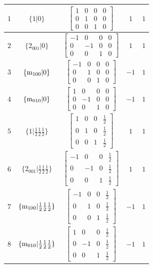 \documentclass[fleqn,8pt]{jsarticle}
\begin{document}
\begin{longtable}{ccccc}
$ 1 $ & $ \{1|0\} $ & $ \begin{bmatrix} 1 & 0 & 0 & 0 \\ 0 & 1 & 0 & 0 \\ 0 & 0 & 1 & 0 \end{bmatrix} $ & $ 1 $ & $ 1 $ \\ \hline
$ 2 $ & $ \{2{}_{001}|0\} $ & $ \begin{bmatrix} -1 & 0 & 0 & 0 \\ 0 & -1 & 0 & 0 \\ 0 & 0 & 1 & 0 \end{bmatrix} $ & $ 1 $ & $ 1 $ \\ \hline
$ 3 $ & $ \{{\rm m}_{100}|0\} $ & $ \begin{bmatrix} -1 & 0 & 0 & 0 \\ 0 & 1 & 0 & 0 \\ 0 & 0 & 1 & 0 \end{bmatrix} $ & $ -1 $ & $ 1 $ \\ \hline
$ 4 $ & $ \{{\rm m}_{010}|0\} $ & $ \begin{bmatrix} 1 & 0 & 0 & 0 \\ 0 & -1 & 0 & 0 \\ 0 & 0 & 1 & 0 \end{bmatrix} $ & $ -1 $ & $ 1 $ \\ \hline
$ 5 $ & $ \{1|\frac{1}{2} \frac{1}{2} \frac{1}{2}\} $ & $ \begin{bmatrix} 1 & 0 & 0 & \frac{1}{2} \\ 0 & 1 & 0 & \frac{1}{2} \\ 0 & 0 & 1 & \frac{1}{2} \end{bmatrix} $ & $ 1 $ & $ 1 $ \\ \hline
$ 6 $ & $ \{2{}_{001}|\frac{1}{2} \frac{1}{2} \frac{1}{2}\} $ & $ \begin{bmatrix} -1 & 0 & 0 & \frac{1}{2} \\ 0 & -1 & 0 & \frac{1}{2} \\ 0 & 0 & 1 & \frac{1}{2} \end{bmatrix} $ & $ 1 $ & $ 1 $ \\ \hline
$ 7 $ & $ \{{\rm m}_{100}|\frac{1}{2} \frac{1}{2} \frac{1}{2}\} $ & $ \begin{bmatrix} -1 & 0 & 0 & \frac{1}{2} \\ 0 & 1 & 0 & \frac{1}{2} \\ 0 & 0 & 1 & \frac{1}{2} \end{bmatrix} $ & $ -1 $ & $ 1 $ \\ \hline
$ 8 $ & $ \{{\rm m}_{010}|\frac{1}{2} \frac{1}{2} \frac{1}{2}\} $ & $ \begin{bmatrix} 1 & 0 & 0 & \frac{1}{2} \\ 0 & -1 & 0 & \frac{1}{2} \\ 0 & 0 & 1 & \frac{1}{2} \end{bmatrix} $ & $ -1 $ & $ 1 $ \\ \hline

\end{longtable}
\end{document}
